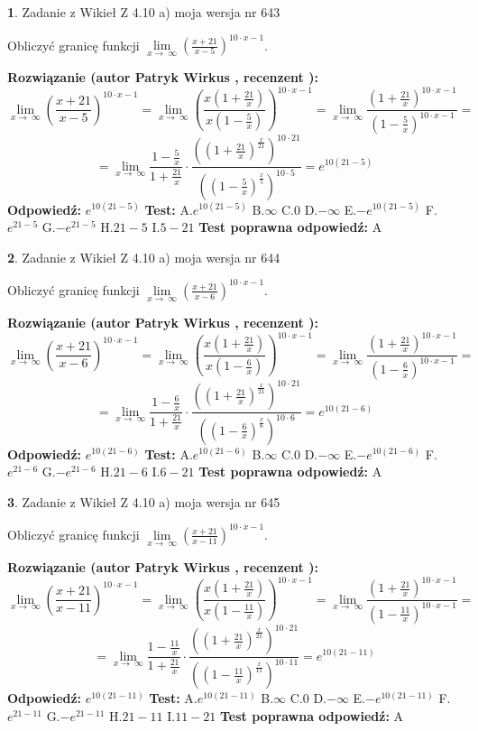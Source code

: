 \documentclass[12pt, a4paper]{article}
\theoremstyle{definition} %
\newtheorem{zad}{}
\newcommand{\zadStart}[1]{\begin{zad}#1\newline}
\newcommand{\zadStop}{\end{zad}}
\newcommand{\rozwStart}[2]{\noindent \textbf{Rozwiązanie (autor #1 , recenzent #2): }\newline}
\newcommand{\rozwStop}{\newline}
\newcommand{\odpStart}{\noindent \textbf{Odpowiedź:}\newline}
\newcommand{\odpStop}{\newline}
\newcommand{\testStart}{\noindent \textbf{Test:}\newline}
\newcommand{\testStop}{\newline}
\newcommand{\kluczStart}{\noindent \textbf{Test poprawna odpowiedź:}\newline}
\newcommand{\kluczStop}{\newline}
\begin{document}
\zadStart{Zadanie z Wikieł Z 4.10 a) moja wersja nr 643}


Obliczyć granicę funkcji  $\lim\limits_{x\to\ \infty}(\frac{x+21}{x-5})^{10\cdot x-1}$.
\zadStop
\rozwStart{Patryk Wirkus}{}
$$\lim\limits_{x\to\ \infty}(\frac{x+21}{x-5})^{10\cdot x-1} = \lim\limits_{x\to\ \infty}(\frac{x(1+\frac{21}{x})}{x(1-\frac{5}{x})})^{10\cdot x-1}=\lim\limits_{x\to\ \infty}\frac{(1+\frac{21}{x})^{10\cdot x-1}}{(1-\frac{5}{x})^{10\cdot x-1}}=$$
$$=\lim\limits_{x\to\ \infty}\frac{1-\frac{5}{x}}{1+\frac{21}{x}}\cdot\frac{((1+\frac{21}{x})^{\frac{x}{21}})^{10\cdot21}}{((1-\frac{5}{x})^{\frac{x}{5}})^{10\cdot5}}=e^{10(21-5)}$$
\rozwStop
\odpStart
$e^{10(21-5)}$
\odpStop
\testStart
A.$e^{10(21-5)}$ B.$\infty$ C.$0$ D.$-\infty$ E.$-e^{10(21-5)}$
F.$e^{21-5}$ G.$-e^{21-5}$
H.$21-5$
I.$5-21$
\testStop
\kluczStart
A
\kluczStop



\zadStart{Zadanie z Wikieł Z 4.10 a) moja wersja nr 644}


Obliczyć granicę funkcji  $\lim\limits_{x\to\ \infty}(\frac{x+21}{x-6})^{10\cdot x-1}$.
\zadStop
\rozwStart{Patryk Wirkus}{}
$$\lim\limits_{x\to\ \infty}(\frac{x+21}{x-6})^{10\cdot x-1} = \lim\limits_{x\to\ \infty}(\frac{x(1+\frac{21}{x})}{x(1-\frac{6}{x})})^{10\cdot x-1}=\lim\limits_{x\to\ \infty}\frac{(1+\frac{21}{x})^{10\cdot x-1}}{(1-\frac{6}{x})^{10\cdot x-1}}=$$
$$=\lim\limits_{x\to\ \infty}\frac{1-\frac{6}{x}}{1+\frac{21}{x}}\cdot\frac{((1+\frac{21}{x})^{\frac{x}{21}})^{10\cdot21}}{((1-\frac{6}{x})^{\frac{x}{6}})^{10\cdot6}}=e^{10(21-6)}$$
\rozwStop
\odpStart
$e^{10(21-6)}$
\odpStop
\testStart
A.$e^{10(21-6)}$ B.$\infty$ C.$0$ D.$-\infty$ E.$-e^{10(21-6)}$
F.$e^{21-6}$ G.$-e^{21-6}$
H.$21-6$
I.$6-21$
\testStop
\kluczStart
A
\kluczStop



\zadStart{Zadanie z Wikieł Z 4.10 a) moja wersja nr 645}


Obliczyć granicę funkcji  $\lim\limits_{x\to\ \infty}(\frac{x+21}{x-11})^{10\cdot x-1}$.
\zadStop
\rozwStart{Patryk Wirkus}{}
$$\lim\limits_{x\to\ \infty}(\frac{x+21}{x-11})^{10\cdot x-1} = \lim\limits_{x\to\ \infty}(\frac{x(1+\frac{21}{x})}{x(1-\frac{11}{x})})^{10\cdot x-1}=\lim\limits_{x\to\ \infty}\frac{(1+\frac{21}{x})^{10\cdot x-1}}{(1-\frac{11}{x})^{10\cdot x-1}}=$$
$$=\lim\limits_{x\to\ \infty}\frac{1-\frac{11}{x}}{1+\frac{21}{x}}\cdot\frac{((1+\frac{21}{x})^{\frac{x}{21}})^{10\cdot21}}{((1-\frac{11}{x})^{\frac{x}{11}})^{10\cdot11}}=e^{10(21-11)}$$
\rozwStop
\odpStart
$e^{10(21-11)}$
\odpStop
\testStart
A.$e^{10(21-11)}$ B.$\infty$ C.$0$ D.$-\infty$ E.$-e^{10(21-11)}$
F.$e^{21-11}$ G.$-e^{21-11}$
H.$21-11$
I.$11-21$
\testStop
\kluczStart
A
\kluczStop
\end{document}
